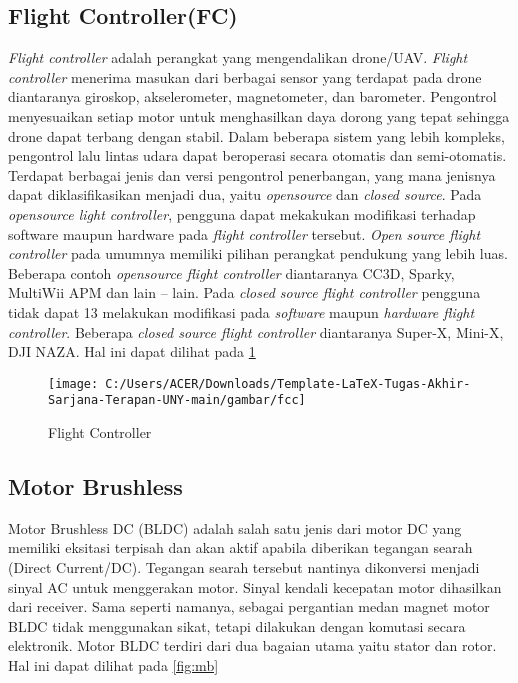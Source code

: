 \subsection{Flight Controller(FC)}

\textit{Flight controller} adalah perangkat yang mengendalikan drone/UAV. \textit{Flight controller} menerima masukan dari berbagai sensor yang terdapat pada drone diantaranya giroskop, akselerometer, magnetometer, dan barometer. Pengontrol menyesuaikan setiap motor untuk menghasilkan daya dorong yang tepat sehingga drone dapat terbang dengan stabil. Dalam beberapa sistem yang lebih kompleks, pengontrol lalu lintas udara dapat beroperasi secara otomatis dan semi-otomatis\cite{priandana2020development}. Terdapat berbagai jenis dan versi pengontrol penerbangan, yang mana jenisnya dapat diklasifikasikan menjadi dua, yaitu \textit{opensource} dan \textit{closed source}. Pada \textit{opensource light controller}, pengguna dapat mekakukan modifikasi terhadap software maupun hardware pada \textit{flight controller} tersebut. \textit{Open source flight controller} pada umumnya memiliki pilihan perangkat pendukung yang lebih luas. Beberapa contoh \textit{opensource flight controller} diantaranya CC3D, Sparky, MultiWii APM dan lain – lain. Pada \textit{closed source flight controller} pengguna tidak dapat 13 melakukan modifikasi pada \textit{software} maupun \textit{hardware flight controller}.  Beberapa \textit{closed source flight controller} diantaranya Super-X, Mini-X, DJI NAZA. Hal ini dapat dilihat pada \cref{fig:fcc}

\begin{figure}[H]
	\centering
	\texttt{[image: C:/Users/ACER/Downloads/Template-LaTeX-Tugas-Akhir-Sarjana-Terapan-UNY-main/gambar/fcc]}
	\caption{Flight Controller}
	\label{fig:fcc}
\end{figure}


\subsection{Motor Brushless}
Motor Brushless DC (BLDC) adalah salah satu jenis dari motor DC yang memiliki eksitasi terpisah dan akan aktif apabila diberikan tegangan searah (Direct Current/DC). Tegangan searah tersebut nantinya dikonversi menjadi sinyal AC untuk menggerakan motor. Sinyal kendali kecepatan motor dihasilkan dari receiver. Sama seperti namanya, sebagai pergantian medan magnet motor BLDC tidak menggunakan sikat, tetapi dilakukan dengan komutasi secara elektronik. Motor BLDC terdiri dari dua bagaian utama yaitu stator dan rotor\cite{irawan2020kontrol}. Hal ini dapat dilihat pada \cref{fig:mb}

